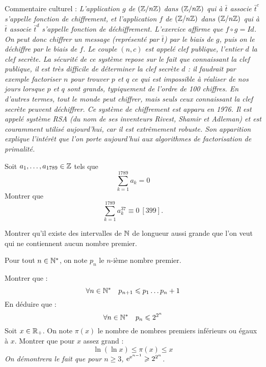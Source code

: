 \documentclass{magnolia}
\begin{document}
\begin{sol}
Commentaire culturel :
 {\it L'application $g$ de $(\mathbb{Z}/n\mathbb{Z})$ dans $(\mathbb{Z}/n\mathbb{Z})$ qui à $\bar{t}$ associe
 $\bar{t}^c$ s'appelle fonction de chiffrement, et l'application $f$ de
 $(\mathbb{Z}/n\mathbb{Z})$ dans $(\mathbb{Z}/n\mathbb{Z})$ qui à $\bar{t}$ associe $\bar{t}^d$ s'appelle
 fonction de déchiffrement. L'exercice affirme que $f\circ g=Id$. On peut donc
 chiffrer un message (représenté par $\bar{t}$) par le biais de $g$, puis on le
 déchiffre par le biais de $f$. Le couple $(n,c)$ est appelé clef publique,
 l'entier $d$ la clef secrète. La sécurité de ce système repose sur le fait que
 connaissant la clef publique, il est très difficile de déterminer la clef
 secrète $d$ : il faudrait par exemple factoriser $n$ pour trouver $p$ et $q$ ce
 qui est impossible à réaliser de nos jours lorsque $p$ et $q$ sont grands,
 typiquement de l'ordre de 100 chiffres. En d'autres termes, tout le monde peut
 chiffrer, mais seuls ceux connaissant la clef secrète peuvent déchiffrer. Ce
 système de chiffrement est apparu en 1976. Il est appelé système {\sc RSA} (du
 nom de ses inventeurs {\sc Rivest}, {\sc Shamir} et {\sc Adleman}) et est
 couramment utilisé aujourd'hui, car il est extrêmement robuste. Son apparition
 explique l'intérêt que l'on porte aujourd'hui aux algorithmes de factorisation
 de primalité.}
\end{sol}



Soit $a_1,\ldots,a_{1789}\in\mathbb{Z}$ tels que
\[\sum_{k=1}^{1789} a_k=0\]
Montrer que
\[\sum_{k=1}^{1789} a_k^{37} \equiv 0\ [399].\]



Montrer qu'il existe des intervalles de $\mathbb{N}$ de longueur aussi grande que l'on
veut qui ne contiennent aucun nombre premier.

Pour tout $n\in{\mathbb{N}^*}$, on note $p_n$ le $n$-ième nombre premier.
\begin{questions}
\question  Montrer que :
  \[\forall n \in {\mathbb{N}^*} \quad p_{n+1} \leqslant p_1 \ldots p_n +1\]
\question  En déduire que :
  \[\forall n \in {\mathbb{N}^*} \quad p_n \leqslant 2^{2^n}\]
\question  Soit $x\in\mathbb{R}_+$. On note $\pi(x)$ le nombre de nombres premiers
  inférieurs ou égaux à $x$. Montrer que pour $x$ assez grand :
  \[\ln(\ln x) \leq \pi(x) \leq x\]
  {\it On démontrera le fait que pour $n\geq3$, ${\rm e}^{{\rm e}^{n-1}} \geqslant 2^{2^n}$.}
\end{questions}
\end{document}
